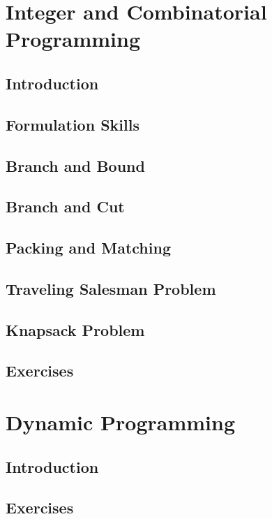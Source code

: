 \documentclass[10pt]{book}
\begin{document}
\part{Integer and Combinatorial Programming}
	\chapter{Introduction}

	\chapter{Formulation Skills}

	\chapter{Branch and Bound}

	\chapter{Branch and Cut}

	\chapter{Packing and Matching}

	\chapter{Traveling Salesman Problem}

	\chapter{Knapsack Problem}

	\chapter{Exercises}

\part{Dynamic Programming}
	\chapter{Introduction}

	\chapter{Exercises}
\end{document}
